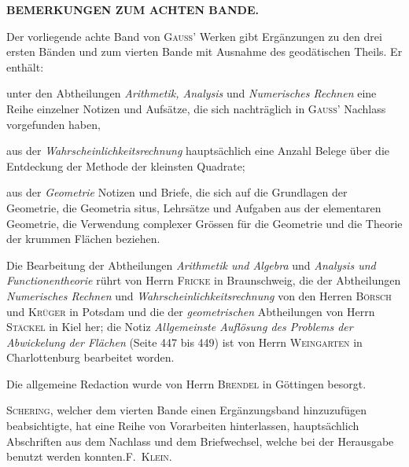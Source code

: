 \begin{center}\Large\bfseries BEMERKUNGEN ZUM ACHTEN BANDE.\end{center}

Der vorliegende achte Band von \textsc{Gauss}' Werken gibt Ergänzungen zu den drei ersten Bänden und zum vierten Bande mit Ausnahme des geodätischen Theils. Er enthält:

unter den Abtheilungen \textit{Arithmetik, Analysis} und \textit{Numerisches Rechnen} eine Reihe einzelner Notizen und Aufsätze, die sich nachträglich in \textsc{Gauss}' Nachlass vorgefunden haben,

aus der \textit{Wahrscheinlichkeitsrechnung} hauptsächlich eine Anzahl Belege über die Entdeckung der Methode der kleinsten Quadrate;

aus der \textit{Geometrie} Notizen und Briefe, die sich auf die Grundlagen der Geometrie, die Geometria situs, Lehrsätze und Aufgaben aus der elementaren Geometrie, die Verwendung complexer Grössen für die Geometrie und die Theorie der krummen Flächen beziehen.

Die Bearbeitung der Abtheilungen \textit{Arithmetik und Algebra} und \textit{Analysis und Functionentheorie} rührt von Herrn \textsc{Fricke} in Braunschweig, die der Abtheilungen \textit{Numerisches Rechnen} und \textit{Wahrscheinlichkeitsrechnung} von den Herren \textsc{Börsch} und \textsc{Krüger} in Potsdam und die der \textit{geometrischen} Abtheilungen von Herrn \textsc{Stäckel} in Kiel her; die Notiz \textit{Allgemeinste Auflösung des Problems der Abwickelung der Flächen} (Seite 447 bis 449) ist von Herrn \textsc{Weingarten} in Charlottenburg bearbeitet worden.

Die allgemeine Redaction wurde von Herrn \textsc{Brendel} in Göttingen besorgt.

\textsc{Schering}, welcher dem vierten Bande einen Ergänzungsband hinzuzufügen beabsichtigte, hat eine Reihe von Vorarbeiten hinterlassen, hauptsächlich Abschriften aus dem Nachlass und dem Briefwechsel, welche bei der Herausgabe benutzt werden konnten.\hfill\mbox{\textsc{F. Klein.}}
